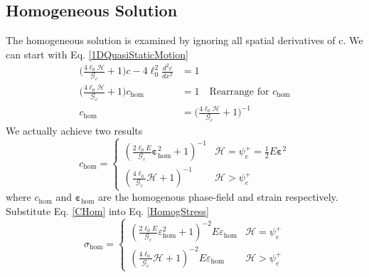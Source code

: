 \documentclass[12pt,3p]{article}
\numberwithin{equation}{section}
\begin{document}
\subsection{Homogeneous Solution}
The homogeneous solution is examined by ignoring all spatial derivatives of c. We can start with Eq. \ref{1DQuasiStaticMotion}
\begin{align*}
\bigg( \frac{4 \ell_0 \mathcal{H}}{\mathcal{G}_c} + 1 \bigg) c - 4 \ell_{0}^2 \frac{d^2 c}{d x^2} &= 1 \\
\bigg( \frac{4 \ell_0 \mathcal{H}}{\mathcal{G}_c} + 1 \bigg) c_{\mathrm{hom}} &= 1 \quad \text{Rearrange for } c_{\mathrm{hom}} \\
c_{\mathrm{hom}} &= \bigg( \frac{4 \ell_0 \mathcal{H}}{\mathcal{G}_c} + 1 \bigg)^{-1}
\end{align*}
We actually achieve two results 
\begin{equation}\label{CHom}
c_{\mathrm{hom}}=\left\{\begin{array}{ll}
\left(\frac{2 \ell_{0} E}{\mathcal{G}_{c}} \boldsymbol{\varepsilon}_{\mathrm{hom}}^{2}+1\right)^{-1} & \mathcal{H}  = \psi_{e}^{+} = \frac{1}{2} E \boldsymbol{\varepsilon}^2 \\
\left(\frac{4 \ell_{0}}{\mathcal{G}_{c}} \mathcal{H}+1\right)^{-1} & \mathcal{H} > \psi_{e}^{+}
\end{array}\right.
\end{equation}
where $c_{\mathrm{hom}}$ and $\boldsymbol{\varepsilon}_{\mathrm{hom}}$ are the homogenous phase-field and strain respectively. Substitute Eq. \ref{CHom} into Eq. \ref{HomogStress}
\begin{equation}
\sigma_{\mathrm{hom}}=\left\{\begin{array}{ll}
\left(\frac{2 \ell_{0} E}{\mathcal{G}_{c}} \varepsilon_{\mathrm{hom}}^{2}+1\right)^{-2} E \varepsilon_{\mathrm{hom}} & \mathcal{H} = \psi_{e}^{+} \\
\left(\frac{4 \ell_{0}}{\mathcal{G}_{c}} \mathcal{H}+1\right)^{-2} E \varepsilon_{\mathrm{hom}} & \mathcal{H} > \psi_{e}^{+}
\end{array}\right.
\end{equation}

\end{document}
